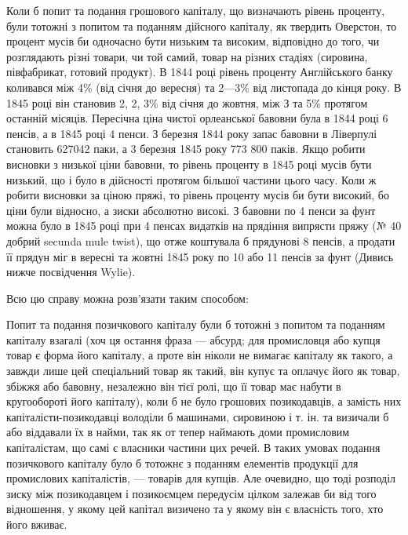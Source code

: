 Коли б попит та подання грошового капіталу, що визначають рівень
проценту, були тотожні з попитом та поданням дійсного капіталу, як твердить
Оверстон, то процент мусів би одночасно бути низьким та високим, відповідно до
того, чи розглядають різні товари, чи той самий, товар на різних стадіях (сировина,
півфабрикат, готовий продукт). В 1844 році рівень проценту Англійського банку
коливався між 4\% (від січня до вересня) та 2—3\% від листопада до
кінця року. В 1845 році він становив 2, 2, 3\% від січня до жовтня, між
З та 5\% протягом останній місяців. Пересічна ціна чистої орлеанської бавовни
була в 1844 році 6 пенсів, а в 1845 році 4 пенси. З березня 1844 року
запас бавовни в Ліверпулі становить 627042 паки, а 3 березня 1845 року
773 800 паків. Якщо робити висновки з низької ціни бавовни, то рівень проценту
в 1845 році мусів бути низький, що і було в дійсності протягом більшої
частини цього часу. Коли ж робити висновки за ціною пряжі, то рівень проценту
мусів би бути високий, бо ціни були відносно, а зиски абсолютно високі.
З бавовни по 4 пенси за фунт можна було в 1845 році при 4 пенсах видатків
на прядіння випрясти пряжу (№ 40 добрий secunda mule twist), що отже коштувала
б прядунові 8 пенсів, а продати її прядун міг в вересні та жовтні 1845 року
по 10 або 11 пенсів за фунт (Дивись нижче посвідчення Wylie).

Всю цю справу можна розв’язати таким способом:

Попит та подання позичкового капіталу були б тотожні з попитом та поданням
капіталу взагалі (хоч ця остання фраза — абсурд; для промисловця або
купця товар є форма його капіталу, а проте він ніколи не вимагає капіталу як
такого, а завжди лише цей спеціальний товар як такий, він купує та оплачує
його як товар, збіжжя або бавовну, незалежно він тієї ролі, що її товар має
набути в кругообороті його капіталу), коли б не було грошових позикодавців,
а замість них капіталісти-позикодавці володіли б машинами, сировиною і т. ін. та
визичали б або віддавали їх в найми, так як от тепер наймають доми промисловим
капіталістам, що самі є власники частини цих речей. В таких умовах
подання позичкового капіталу було б тотожнє з поданням елементів продукції
для промислових капіталістів, — товарів для купців. Але очевидно, що тоді розподіл
зиску між позикодавцем і позикоємцем передусім цілком залежав би від
того відношення, у якому цей капітал визичено та у якому він є власність
того, хто його вживає.

